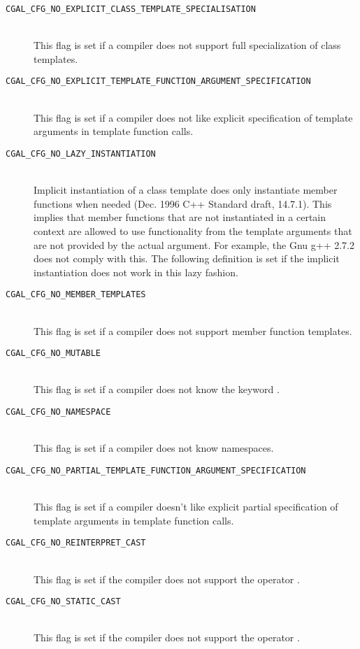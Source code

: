 \begin{description}
\item[{\tt CGAL\_CFG\_NO\_EXPLICIT\_CLASS\_TEMPLATE\_SPECIALISATION}]~\\
  This flag is set if a compiler does not support full specialization
  of class templates.

\item[{\tt CGAL\_CFG\_NO\_EXPLICIT\_TEMPLATE\_FUNCTION\_ARGUMENT\_SPECIFICATION}]~\\
  This flag is set if a compiler does not like explicit specification
  of template arguments in template function calls.

\item[{\tt CGAL\_CFG\_NO\_LAZY\_INSTANTIATION}]~\\
  Implicit instantiation of a class template does only instantiate
  member functions when needed (Dec. 1996 C++ Standard draft, 14.7.1).
  This implies that member functions that are not instantiated in a
  certain context are allowed to use functionality from the template
  arguments that are not provided by the actual argument. For example,
  the Gnu g++ 2.7.2 does not comply with this. The following definition
  is set if the implicit instantiation does not work in this lazy
  fashion.

\item[{\tt CGAL\_CFG\_NO\_MEMBER\_TEMPLATES}]~\\
  This flag is set if a compiler does not support member function
  templates.

\item[{\tt CGAL\_CFG\_NO\_MUTABLE}]~\\
  This flag is set if a compiler does not know the keyword
  .

\item[{\tt CGAL\_CFG\_NO\_NAMESPACE}]~\\
 This flag is set if a compiler does not know namespaces.

\item[{\tt CGAL\_CFG\_NO\_PARTIAL\_TEMPLATE\_FUNCTION\_ARGUMENT\_SPECIFICATION}]~\\
 This flag is set if a compiler doesn't like explicit partial 
 specification of template arguments in template function calls.

\item[{\tt CGAL\_CFG\_NO\_REINTERPRET\_CAST}]~\\
  This flag is set if the compiler does not support the operator
  .

\item[{\tt CGAL\_CFG\_NO\_STATIC\_CAST}]~\\
  This flag is set if the compiler does not support the operator
  .


\end{description}
